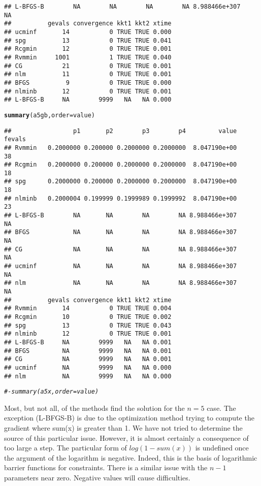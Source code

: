\documentclass[11pt]{article}\usepackage[]{graphicx}\usepackage[]{color}
\makeatletter
\newcommand{\hlcom}[1]{\textcolor[rgb]{0.678,0.584,0.686}{\textit{#1}}}%
\newcommand{\hlstd}[1]{\textcolor[rgb]{0.345,0.345,0.345}{#1}}%
\newcommand{\hlkwc}[1]{\textcolor[rgb]{0.333,0.667,0.333}{#1}}%
\newcommand{\hlkwd}[1]{\textcolor[rgb]{0.737,0.353,0.396}{\textbf{#1}}}%
\newenvironment{kframe}{%
 \def\at@end@of@kframe{}%
 \ifinner\ifhmode%
  \def\at@end@of@kframe{\end{minipage}}%
  \begin{minipage}{\columnwidth}%
 \fi\fi%
 \def\FrameCommand##1{\hskip\@totalleftmargin \hskip-\fboxsep
 \colorbox{shadecolor}{##1}\hskip-\fboxsep
     \hskip-\linewidth \hskip-\@totalleftmargin \hskip\columnwidth}%
 \MakeFramed {\advance\hsize-\width
   \@totalleftmargin\z@ \linewidth\hsize
   \@setminipage}}%
 {\par\unskip\endMakeFramed%
 \at@end@of@kframe}
\newenvironment{knitrout}{}{} %
\makeatother
\begin{document}
\begin{knitrout}
\begin{kframe}
\begin{verbatim}
## L-BFGS-B        NA        NA        NA        NA 8.988466e+307     NA
##          gevals convergence kkt1 kkt2 xtime
## ucminf       14           0 TRUE TRUE 0.000
## spg          13           0 TRUE TRUE 0.041
## Rcgmin       12           0 TRUE TRUE 0.001
## Rvmmin     1001           1 TRUE TRUE 0.040
## CG           21           0 TRUE TRUE 0.001
## nlm          11           0 TRUE TRUE 0.001
## BFGS          9           0 TRUE TRUE 0.000
## nlminb       12           0 TRUE TRUE 0.001
## L-BFGS-B     NA        9999   NA   NA 0.000
\end{verbatim}
\begin{alltt}
\hlkwd{summary}\hlstd{(a5gb,}\hlkwc{order}\hlstd{=value)}
\end{alltt}
\begin{verbatim}
##                 p1       p2        p3        p4         value fevals
## Rvmmin   0.2000000 0.200000 0.2000000 0.2000000  8.047190e+00     38
## Rcgmin   0.2000000 0.200000 0.2000000 0.2000000  8.047190e+00     18
## spg      0.2000000 0.200000 0.2000000 0.2000000  8.047190e+00     18
## nlminb   0.2000004 0.199999 0.1999989 0.1999992  8.047190e+00     23
## L-BFGS-B        NA       NA        NA        NA 8.988466e+307     NA
## BFGS            NA       NA        NA        NA 8.988466e+307     NA
## CG              NA       NA        NA        NA 8.988466e+307     NA
## ucminf          NA       NA        NA        NA 8.988466e+307     NA
## nlm             NA       NA        NA        NA 8.988466e+307     NA
##          gevals convergence kkt1 kkt2 xtime
## Rvmmin       14           0 TRUE TRUE 0.004
## Rcgmin       10           0 TRUE TRUE 0.002
## spg          13           0 TRUE TRUE 0.043
## nlminb       12           0 TRUE TRUE 0.001
## L-BFGS-B     NA        9999   NA   NA 0.001
## BFGS         NA        9999   NA   NA 0.001
## CG           NA        9999   NA   NA 0.001
## ucminf       NA        9999   NA   NA 0.000
## nlm          NA        9999   NA   NA 0.000
\end{verbatim}
\begin{alltt}
\hlcom{#- summary(a5x,order=value)}
\end{alltt}
\end{kframe}
\end{knitrout}

Most, but not all, of the methods find the solution for the $n=5$ case. The exception (L-BFGS-B) is 
due to the optimization method trying to compute the gradient where sum(x) is greater than 1. We 
have not tried to determine the source of this particular issue. However, it is almost certainly 
a consequence of too large a step. The particular form of $log(1-sum(x))$ 
is undefined once the argument of
the logarithm is negative. Indeed, this is the basis of 
logarithmic barrier functions for constraints. There
is a similar issue with the $n-1$ parameters near zero. Negative values will cause difficulties. 
\end{document}

